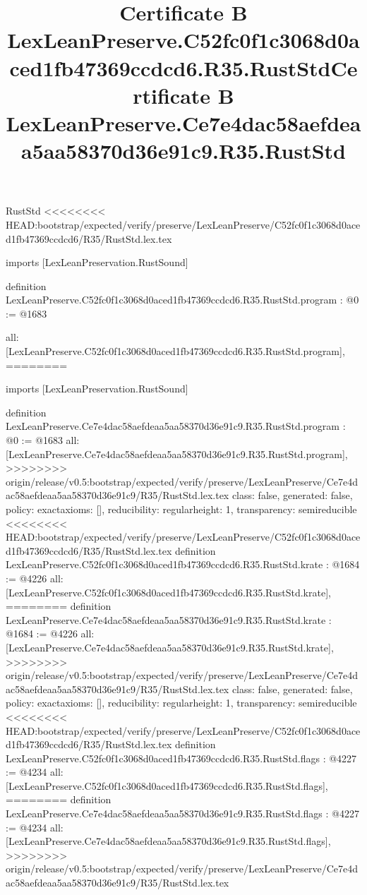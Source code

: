 \begin{lexlean}{RustStd}
<<<<<<<< HEAD:bootstrap/expected/verify/preserve/LexLeanPreserve/C52fc0f1c3068d0aced1fb47369ccdcd6/R35/RustStd.lex.tex
\title{Certificate B LexLeanPreserve.C52fc0f1c3068d0aced1fb47369ccdcd6.R35.RustStd}
\begin{coremodule}
imports [LexLeanPreservation.RustSound]

definition LexLeanPreserve.C52fc0f1c3068d0aced1fb47369ccdcd6.R35.RustStd.program : @0 := @1683 {
  all: [LexLeanPreserve.C52fc0f1c3068d0aced1fb47369ccdcd6.R35.RustStd.program],
========
\title{Certificate B LexLeanPreserve.Ce7e4dac58aefdeaa5aa58370d36e91c9.R35.RustStd}
\begin{coremodule}
imports [LexLeanPreservation.RustSound]

definition LexLeanPreserve.Ce7e4dac58aefdeaa5aa58370d36e91c9.R35.RustStd.program : @0 := @1683 {
  all: [LexLeanPreserve.Ce7e4dac58aefdeaa5aa58370d36e91c9.R35.RustStd.program],
>>>>>>>> origin/release/v0.5:bootstrap/expected/verify/preserve/LexLeanPreserve/Ce7e4dac58aefdeaa5aa58370d36e91c9/R35/RustStd.lex.tex
  class: false,
  generated: false,
  policy: exact{axioms: []},
  reducibility: regular{height: 1},
  transparency: semireducible
}
<<<<<<<< HEAD:bootstrap/expected/verify/preserve/LexLeanPreserve/C52fc0f1c3068d0aced1fb47369ccdcd6/R35/RustStd.lex.tex
definition LexLeanPreserve.C52fc0f1c3068d0aced1fb47369ccdcd6.R35.RustStd.krate : @1684 := @4226 {
  all: [LexLeanPreserve.C52fc0f1c3068d0aced1fb47369ccdcd6.R35.RustStd.krate],
========
definition LexLeanPreserve.Ce7e4dac58aefdeaa5aa58370d36e91c9.R35.RustStd.krate : @1684 := @4226 {
  all: [LexLeanPreserve.Ce7e4dac58aefdeaa5aa58370d36e91c9.R35.RustStd.krate],
>>>>>>>> origin/release/v0.5:bootstrap/expected/verify/preserve/LexLeanPreserve/Ce7e4dac58aefdeaa5aa58370d36e91c9/R35/RustStd.lex.tex
  class: false,
  generated: false,
  policy: exact{axioms: []},
  reducibility: regular{height: 1},
  transparency: semireducible
}
<<<<<<<< HEAD:bootstrap/expected/verify/preserve/LexLeanPreserve/C52fc0f1c3068d0aced1fb47369ccdcd6/R35/RustStd.lex.tex
definition LexLeanPreserve.C52fc0f1c3068d0aced1fb47369ccdcd6.R35.RustStd.flags : @4227 := @4234 {
  all: [LexLeanPreserve.C52fc0f1c3068d0aced1fb47369ccdcd6.R35.RustStd.flags],
========
definition LexLeanPreserve.Ce7e4dac58aefdeaa5aa58370d36e91c9.R35.RustStd.flags : @4227 := @4234 {
  all: [LexLeanPreserve.Ce7e4dac58aefdeaa5aa58370d36e91c9.R35.RustStd.flags],
>>>>>>>> origin/release/v0.5:bootstrap/expected/verify/preserve/LexLeanPreserve/Ce7e4dac58aefdeaa5aa58370d36e91c9/R35/RustStd.lex.tex
}}}
\end{coremodule}}
\end{coremodule}
\end{lexlean}
